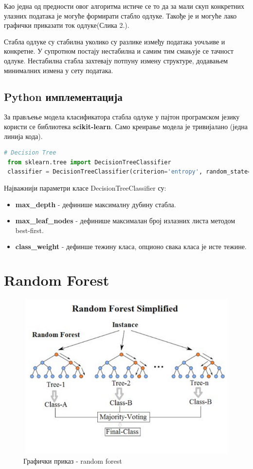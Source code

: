 \documentclass[11pt]{article} %
\begin{document}
Као једна од предности овог алгоритма истиче се то да за мали скуп конкретних улазних података је могуће формирати стабло одлуке. Такође је и могуће лако графички приказати ток одлуке(Слика 2.).

Стабла одлуке су стабилна уколико су разлике између података уочљиве и конкретне. У супротном постају нестабилна и самим тим смањује се тачност одлуке. Нестабилна стабла захтевају потпуну измену структуре, додавањем минималних измена у сету података.
\subsection{Python имплементација}

За прављење модела класификатора стабла одлуке у пајтон програмском језику користи се библиотека \textbf{scikit-learn}. Само креирање модела је тривијалано (једна линија кода).

\begin{lstlisting}[language=Python,title=Пример 2. Стабло одлуке]
 # Decision Tree 
 from sklearn.tree import DecisionTreeClassifier  
 classifier = DecisionTreeClassifier(criterion='entropy', random_state=0)   
\end{lstlisting}

Најважнији параметри класе DecisionTreeClassifier су:
\begin{itemize}
	\item \textbf{max\_depth} - дефинише максималну дубину стабла.
	\item \textbf{max\_leaf\_nodes} - дефинише максималан број излазних листа методом best-first.
	\item \textbf{class\_weight} - дефинше тежину класа, опционо свака класа је исте тежине.
\end{itemize}

\section{Random Forest}

\begin{figure}[h]
\centering
	\includegraphics[scale=0.5]{random_forest}
	\caption{Графички приказ - random forest} 
\end{figure}
\end{document}
